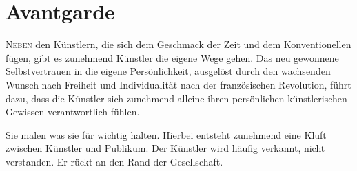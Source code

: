 \section{Avantgarde}
\lettrine{N}{eben} den Künstlern, die sich dem Geschmack der Zeit und dem Konventionellen fügen, gibt es zunehmend
Künstler die eigene
Wege gehen. Das neu gewonnene Selbstvertrauen in die eigene Persönlichkeit, ausgelöst durch den wachsenden Wunsch nach
Freiheit und Individualität nach der französischen Revolution, führt dazu, dass die Künstler sich zunehmend alleine ihren
persönlichen künstlerischen Gewissen verantwortlich fühlen.

Sie malen was sie für wichtig halten. Hierbei entsteht zunehmend eine Kluft zwischen Künstler und Publikum. Der Künstler
wird häufig verkannt, nicht verstanden. Er rückt an den Rand der Gesellschaft.

